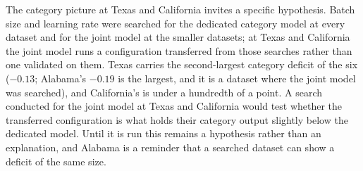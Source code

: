 The category picture at Texas and California invites a specific hypothesis. Batch size and learning
rate were searched for the dedicated category model at every dataset and for the joint model at the
smaller datasets; at Texas and California the joint model runs a configuration transferred from
those searches rather than one validated on them. Texas carries the second-largest category deficit of the
six ($-0.13$; Alabama's $-0.19$ is the largest, and it is a dataset where the joint model was
searched), and California's is under a hundredth of a point. A search conducted for the joint model
at Texas and California would test whether the transferred configuration is what holds their
category output slightly below the dedicated model. Until it is run this remains a hypothesis rather
than an explanation, and Alabama is a reminder that a searched dataset can show a deficit of the same
size.


